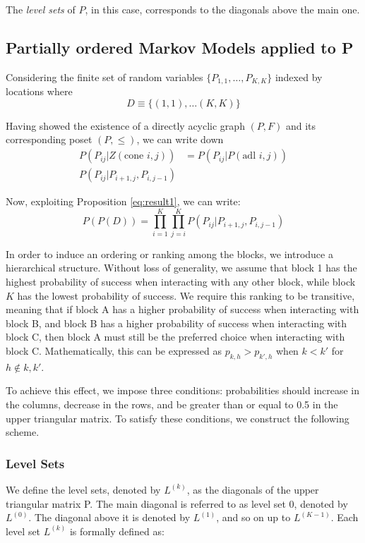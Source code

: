 \documentclass[11pt]{amsart}
\begin{document}
The \textit{level sets} of $P$, in this case, corresponds to the diagonals above the main one.


\subsection{Partially ordered Markov Models applied to P}
\bigskip
Considering the finite set of random variables $\{P_{1,1},\dots, P_{K,K} \}$ indexed by locations where 
$$D\equiv \{(1,1), \dots (K,K)\}$$

Having showed the existence of a directly acyclic graph $ (P,F)$ and its corresponding poset $(P, \leq)$, we can write down 
\begin{align}
P(P_{ij}| Z(\text{cone } i,j)) &= P(P_{ij}| P(\text{adl } i,j))\\
P(P_{ij}| P_{i+1,j}, P_{i,j-1})
\end{align}

Now, exploiting Proposition \eqref{eq:result1}, we can write:
\begin{equation}
P(P(D)) = \prod_{i=1}^K\prod_{j=i}^K P(P_{ij}| P_{i+1,j}, P_{i,j-1})
\end{equation}


In order to induce an ordering or ranking among the blocks, we introduce a hierarchical structure. Without loss of generality, we assume that block 1 has the highest probability of success when interacting with any other block, while block $K$ has the lowest probability of success. We require this ranking to be transitive, meaning that if block A has a higher probability of success when interacting with block B, and block B has a higher probability of success when interacting with block C, then block A must still be the preferred choice when interacting with block C. Mathematically, this can be expressed as $p_{k,h} > p_{k',h}$ when $k < k'$ for $h \notin { k, k' }$.

To achieve this effect, we impose three conditions: probabilities should increase in the columns, decrease in the rows, and be greater than or equal to 0.5 in the upper triangular matrix. To satisfy these conditions, we construct the following scheme.

\subsubsection{Level Sets}

We define the level sets, denoted by $L^{(k)}$, as the diagonals of the upper triangular matrix P. The main diagonal is referred to as level set 0, denoted by $L^{(0)}$. The diagonal above it is denoted by $L^{(1)}$, and so on up to $L^{(K-1)}$. Each level set $L^{(k)}$ is formally defined as:
\end{document}
